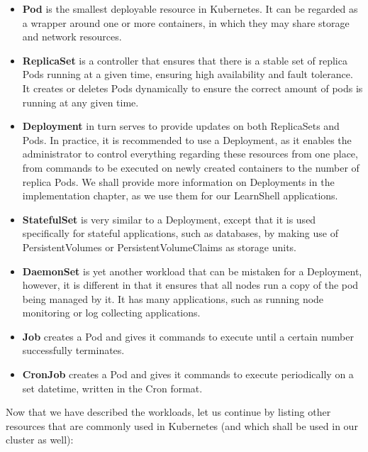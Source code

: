 \documentclass[thesis=B,english]{FITthesis}[2019/12/23]
\begin{document}
\begin{itemize}
  \setlength\itemsep{0em}
  \item \textbf{Pod} is the smallest deployable resource in Kubernetes. It can be regarded as a wrapper around one or more containers, in which they may share storage and network resources.
  \item \textbf{ReplicaSet} is a controller that ensures that there is a stable set of replica Pods running at a given time, ensuring high availability and fault tolerance. It creates or deletes Pods dynamically to ensure the correct amount of pods is running at any given time.
  \item \textbf{Deployment} in turn serves to provide updates on both ReplicaSets and Pods. In practice, it is recommended to use a Deployment, as it enables the administrator to control everything regarding these resources from one place, from commands to be executed on newly created containers to the number of replica Pods. We shall provide more information on Deployments in the implementation chapter, as we use them for our LearnShell applications.
  \item \textbf{StatefulSet} is very similar to a Deployment, except that it is used specifically for stateful applications, such as databases, by making use of PersistentVolumes or PersistentVolumeClaims as storage units.
  \item \textbf{DaemonSet} is yet another workload that can be mistaken for a Deployment, however, it is different in that it ensures that all nodes run a copy of the pod being managed by it. It has many applications, such as running node monitoring or log collecting applications.
  \item \textbf{Job} creates a Pod and gives it commands to execute until a certain number successfully terminates.
  \item \textbf{CronJob} creates a Pod and gives it commands to execute periodically on a set datetime, written in the Cron format.
\end{itemize}

Now that we have described the workloads, let us continue by listing other resources that are commonly used in Kubernetes (and which shall be used in our cluster as well):
\end{document}
